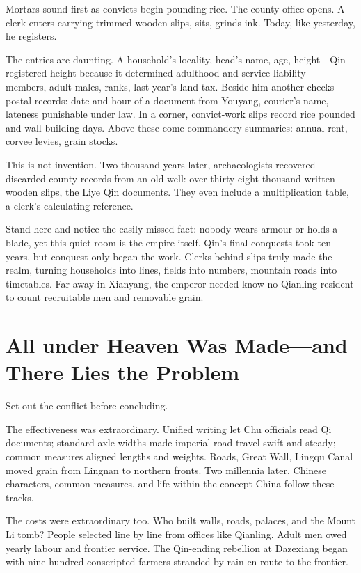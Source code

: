 Mortars sound first as convicts begin pounding rice. The county office opens. A clerk enters carrying trimmed wooden slips, sits, grinds ink. Today, like yesterday, he registers.

The entries are daunting. A household's locality, head's name, age, height---Qin registered height because it determined adulthood and service liability---members, adult males, ranks, last year's land tax. Beside him another checks postal records: date and hour of a document from Youyang, courier's name, lateness punishable under law. In a corner, convict-work slips record rice pounded and wall-building days. Above these come commandery summaries: annual rent, corvee levies, grain stocks.

This is not invention. Two thousand years later, archaeologists recovered discarded county records from an old well: over thirty-eight thousand written wooden slips, the Liye Qin documents. They even include a multiplication table, a clerk's calculating reference.

Stand here and notice the easily missed fact: nobody wears armour or holds a blade, yet this quiet room is the empire itself. Qin's final conquests took ten years, but conquest only began the work. Clerks behind slips truly made the realm, turning households into lines, fields into numbers, mountain roads into timetables. Far away in Xianyang, the emperor needed know no Qianling resident to count recruitable men and removable grain.

\section[All under Heaven Had to Be Made]{All under Heaven Was Made---and There Lies the Problem}
Set out the conflict before concluding.

The effectiveness was extraordinary. Unified writing let Chu officials read Qi documents; standard axle widths made imperial-road travel swift and steady; common measures aligned lengths and weights. Roads, Great Wall, Lingqu Canal moved grain from Lingnan to northern fronts. Two millennia later, Chinese characters, common measures, and life within the concept China follow these tracks.

The costs were extraordinary too. Who built walls, roads, palaces, and the Mount Li tomb? People selected line by line from offices like Qianling. Adult men owed yearly labour and frontier service. The Qin-ending rebellion at Dazexiang began with nine hundred conscripted farmers stranded by rain en route to the frontier.

